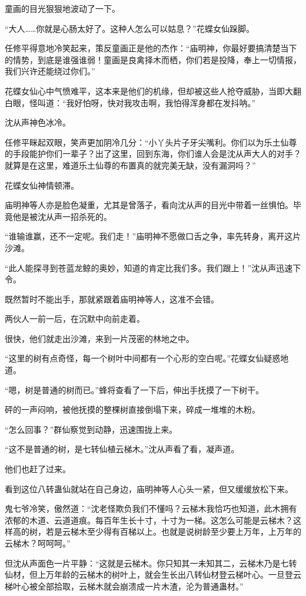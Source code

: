 \begin{this_body}
童画的目光狠狠地波动了一下。

“大人……你就是心肠太好了。这种人怎么可以姑息？”花蝶女仙跺脚。

任修平得意地冷笑起来，策反童画正是他的杰作：“庙明神，你最好要搞清楚当下的情势，到底是谁强谁弱！童画是良禽择木而栖，你们若是投降，奉上一切情报，我们兴许还能绕过你们。”

花蝶女仙心中气愤难平，这本来是他们的机缘，但却被这些人抢夺威胁，当即大翻白眼，怪叫道：“我好怕呀，快对我攻击啊，我怕得浑身都在发抖呐。”

沈从声神色冰冷。

任修平眯起双眼，笑声更加阴冷几分：“小丫头片子牙尖嘴利。你们以为乐土仙尊的手段能护你们一辈子？出了这里，回到东海，你们谁人会是沈从声大人的对手？就算是在这里，难道乐土仙尊的布置真的就完美无缺，没有漏洞吗？”

花蝶女仙神情顿滞。

庙明神等人亦是脸色凝重，尤其是曾落子，看向沈从声的目光中带着一丝惧怕。毕竟他是被沈从声一招杀死的。

“谁输谁赢，还不一定呢。我们走！”庙明神不愿做口舌之争，率先转身，离开这片沙滩。

“此人能探寻到苍蓝龙鲸的奥妙，知道的肯定比我们多。我们跟上！”沈从声迅速下令。

既然暂时不能出手，那就紧跟着庙明神等人，这准不会错。

两伙人一前一后，在沉默中向前走着。

很快，他们就走出沙滩，来到一片茂密的林地之中。

“这里的树有点奇怪，每一个树叶中间都有一个心形的空白呢。”花蝶女仙疑惑地道。

“嗯，树是普通的树而已。”蜂将查看了一下后，伸出手抚摸了一下树干。

砰的一声闷响，被他抚摸的整棵树直接倒塌下来，碎成一堆堆的木粉。

“怎么回事？”群仙察觉到动静，迅速围拢上来。

“这不是普通的树，是七转仙植云梯木。”沈从声看了看，凝声道。

他们也赶了过来。

看到这位八转蛊仙就站在自己身边，庙明神等人心头一紧，但又缓缓放松下来。

鬼七爷冷笑，傲然道：“沈老怪欺负我们不懂吗？云梯木我恰巧也知道，此木拥有浓郁的木道、云道道痕。每百年生长十寸，十寸为一梯。这怎么可能是云梯木？这样高的树，若是云梯木至少得有百梯以上。也就是说树龄至少要上万年，上万年的云梯木？呵呵呵。”

但沈从声面色一片平静：“这就是云梯木。你只知其一未知其二，云梯木乃是七转仙材，但上万年龄的云梯木的树叶上，就会生长出八转仙材登云梯叶心。一旦登云梯叶心被全部拾取，云梯木就会崩溃成一片木渣，沦为普通蛊材。”


\end{this_body}
